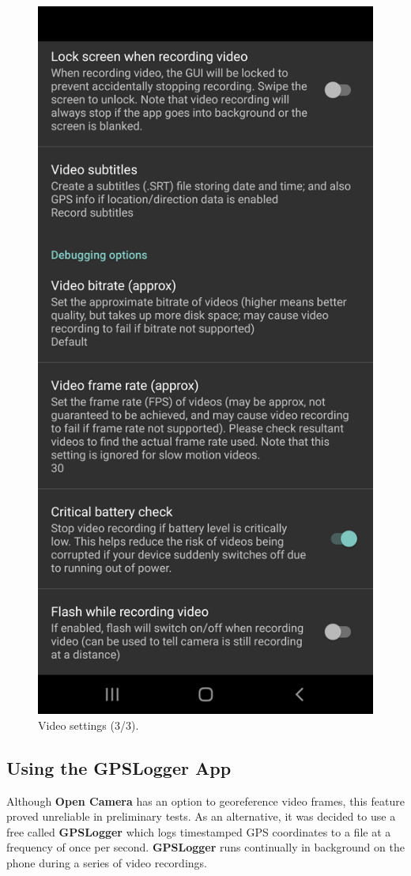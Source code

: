 \documentclass[12pt,letterpaper,english,bibliography=totocnumbered, abstract=on]{scrartcl}
\begin{document}
\begin{figure}[h]
	\centering
	\includegraphics[width=0.7\linewidth]{images/videosettings3}
	\caption{Video settings (3/3).}
	\label{fig:videosettings3}
\end{figure}

\subsection{Using the GPSLogger App}

Although \textbf{Open Camera} has an option to georeference video frames, this feature proved unreliable in preliminary tests. As an alternative, it was decided to use a free called \textbf{GPSLogger} which logs timestamped GPS coordinates to a file at a frequency of once per second. \textbf{GPSLogger} runs continually in background on the phone during a series of video recordings.
\end{document}
